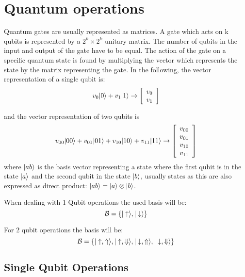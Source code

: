 \chapter{Quantum operations}
\label{operations}
Quantum gates are usually represented as matrices. A gate which acts on k qubits is represented by a $2^k\times2^k$ unitary matrix.
The number of qubits in the input and output of the gate have to be equal. The action of the gate on a specific quantum state is found by multiplying the vector which represents the state by the matrix representing the gate. In the following, the vector representation of a single qubit is:
\begin{equation}
  v_0|0\rangle + v_1|1\rangle \rightarrow \left[\begin{array}{c}
  v_0 \\
  v_1
  \end{array}\right]
\end{equation}

and the vector representation of two qubits is
\begin{equation}
  v_{00}|00\rangle + v_{01}|01\rangle + v_{10}|10\rangle + v_{11}|11\rangle \rightarrow
  \left[\begin{array}{c}
  v_{00} \\
  v_{01} \\
  v_{10} \\
  v_{11}
  \end{array}\right]
\end{equation}
where $|ab\rangle$ is the basis vector representing a state where the first qubit is in the state $|a\rangle$ and the second qubit in the state $|b\rangle$, usually states as this are also expressed as direct product: $|ab\rangle=|a\rangle\otimes|b\rangle$.

When dealing with 1 Qubit operations the used basis will be:
\begin{equation}
  \mathcal{B} = \left\{|\uparrow\rangle,|\downarrow\rangle\right\}
\label{basis1}
\end{equation}

For 2 qubit operations the basis will be:
\begin{equation}  %
  \mathcal{B} = \left\{\ket{\uaw,\Uaw},\ket{\uaw,\Daw},
                       \ket{\daw,\Uaw},\ket{\daw,\Daw}\right\}
\label{basis2}
\end{equation}


\section{Single Qubit Operations}

